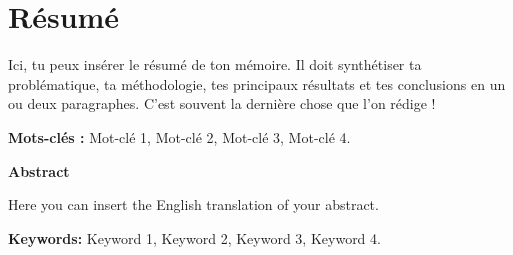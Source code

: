 
\chapter*{Résumé}

Ici, tu peux insérer le résumé de ton mémoire. Il doit synthétiser ta problématique, ta méthodologie, tes principaux résultats et tes conclusions en un ou deux paragraphes. C'est souvent la dernière chose que l'on rédige !

\vspace{1cm}
\noindent \textbf{Mots-clés :} Mot-clé 1, Mot-clé 2, Mot-clé 3, Mot-clé 4.

\vspace{2cm}

\begin{center}
    \Large \textbf{Abstract}
\end{center}
\vspace{0.5cm}

Here you can insert the English translation of your abstract. 

\vspace{1cm}
\noindent \textbf{Keywords:} Keyword 1, Keyword 2, Keyword 3, Keyword 4.